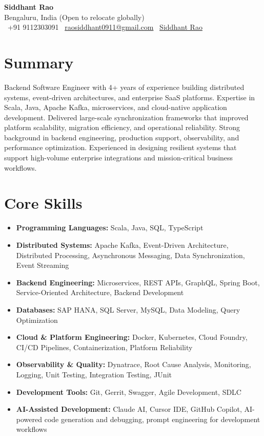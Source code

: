 \documentclass[11pt,a4paper]{article}
\begin{document}
\begin{center}
    {\Huge \textbf{Siddhant Rao}}\\[5pt]
    Bengaluru, India (Open to relocate globally)\\[5pt]
    \faPhone\ +91 9112303091 \quad
    \faEnvelope\ \href{mailto:raosiddhant0911@gmail.com}{raosiddhant0911@gmail.com} \quad
    \faLinkedin\ \href{https://linkedin.com/in/siddhant-rao-a696471b4}{Siddhant Rao}
\end{center}

\vspace{5pt}

\section*{Summary}
Backend Software Engineer with 4+ years of experience building distributed systems, event-driven architectures, and enterprise SaaS platforms. Expertise in Scala, Java, Apache Kafka, microservices, and cloud-native application development. Delivered large-scale synchronization frameworks that improved platform scalability, migration efficiency, and operational reliability. Strong background in backend engineering, production support, observability, and performance optimization. Experienced in designing resilient systems that support high-volume enterprise integrations and mission-critical business workflows.

\section*{Core Skills}
\begin{itemize}[leftmargin=*, itemsep=2pt, topsep=0pt]
    \item \textbf{Programming Languages:} Scala, Java, SQL, TypeScript
    \item \textbf{Distributed Systems:} Apache Kafka, Event-Driven Architecture, Distributed Processing, Asynchronous Messaging, Data Synchronization, Event Streaming
    \item \textbf{Backend Engineering:} Microservices, REST APIs, GraphQL, Spring Boot, Service-Oriented Architecture, Backend Development
    \item \textbf{Databases:} SAP HANA, SQL Server, MySQL, Data Modeling, Query Optimization
    \item \textbf{Cloud \& Platform Engineering:} Docker, Kubernetes, Cloud Foundry, CI/CD Pipelines, Containerization, Platform Reliability
    \item \textbf{Observability \& Quality:} Dynatrace, Root Cause Analysis, Monitoring, Logging, Unit Testing, Integration Testing, JUnit
    \item \textbf{Development Tools:} Git, Gerrit, Swagger, Agile Development, SDLC
    \item \textbf{AI-Assisted Development:} Claude AI, Cursor IDE, GitHub Copilot, AI-powered code generation and debugging, prompt engineering for development workflows
\end{itemize}
\end{document}
